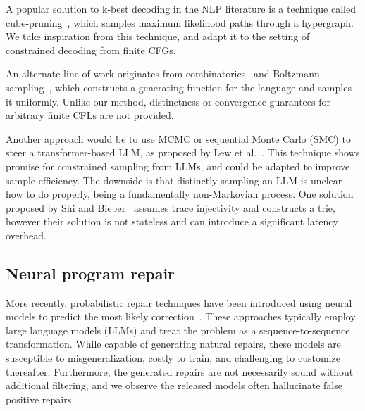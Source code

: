 \documentclass[sigplan,review,acmsmall,nonacm,screen,anonymous]{acmart}\settopmatter{printfolios=false,printccs=false,printacmref=false}
\begin{document}
A popular solution to k-best decoding in the NLP literature is a technique called cube-pruning~\cite{huang2005better, chiang2007hierarchical}, which samples maximum likelihood paths through a hypergraph. We take inspiration from this technique, and adapt it to the setting of constrained decoding from finite CFGs.

An alternate line of work originates from combinatorics~\cite{hickey1983uniform, gore1997quasi} and Boltzmann sampling~\cite{duchon2004boltzmann}, which constructs a generating function for the language and samples it uniformly. Unlike our method, distinctness or convergence guarantees for arbitrary finite CFLs are not provided.

Another approach would be to use MCMC or sequential Monte Carlo (SMC) to steer a transformer-based LLM, as proposed by Lew et al.~\cite{lew2023sequential}. This technique shows promise for constrained sampling from LLMs, and could be adapted to improve sample efficiency. The downside is that distinctly sampling an LLM is unclear how to do properly, being a fundamentally non-Markovian process. One solution proposed by Shi and Bieber~\cite{shi2020incremental} assumes trace injectivity and constructs a trie, however their solution is not stateless and can introduce a significant latency overhead.


\subsection{Neural program repair}

More recently, probabilistic repair techniques have been introduced using neural models to predict the most likely correction~\cite{allamanis2021self, chirkova2021empirical, drain2021generating}. These approaches typically employ large language models (LLMs) and treat the problem as a sequence-to-sequence transformation. While capable of generating natural repairs, these models are susceptible to misgeneralization, costly to train, and challenging to customize thereafter. Furthermore, the generated repairs are not necessarily sound without additional filtering, and we observe the released models often hallucinate false positive repairs.
\end{document}
